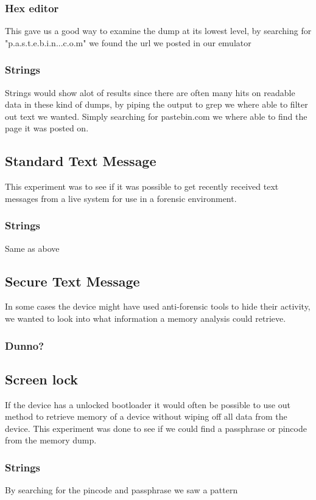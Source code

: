   \subsubsection{Hex editor}
  This gave us a good way to examine the dump at its lowest level, by searching for 
  "p.a.s.t.e.b.i.n...c.o.m" we found the url we posted in our emulator

  \subsubsection{Strings}
  Strings would show alot of results since there are often many hits on readable 
  data in these kind of dumps, by piping the output to grep we where able to 
  filter out text we wanted. Simply searching for pastebin.com we where able to 
  find the page it was posted on. 

\subsection{Standard Text Message}
This experiment was to see if it was possible to get recently received text 
messages from a live system for use in a forensic environment.

  \subsubsection{Strings}
  Same as above %

\subsection{Secure Text Message}
In some cases the device might have used anti-forensic tools to hide their 
activity, we wanted to look into what information a memory analysis could 
retrieve.

\subsubsection{Dunno?}

\subsection{Screen lock}
If the device has a unlocked bootloader it would often be possible to use out 
method to retrieve memory of a device without wiping off all data from the 
device. This experiment was done to see if we could find a passphrase or 
pincode from the memory dump.

  \subsubsection{Strings}
  By searching for the pincode and passphrase we saw a pattern 

